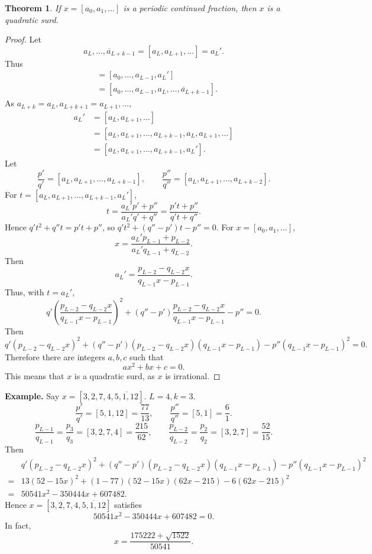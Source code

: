 \documentclass{article}
\newtheorem{theorem}{Theorem}
\theoremstyle{definition}
\begin{document}
\begin{theorem}
If $x=[a_0,a_1,\ldots]$ is a periodic continued fraction, then $x$ is a quadratic surd.
\end{theorem}
\begin{proof}
Let
\[
\overline{a_L,\ldots,a_{L+k-1}} = [a_L,a_{L+1},\ldots] = a_L'.
\]
Thus
\begin{align*}
[a_0,\ldots,a_{L-1},a_L,a_{L+1},\ldots]
&=[a_0,\ldots,a_{L-1},a_L']\\
&=[a_0,\ldots,a_{L-1},\overline{a_L,\ldots,a_{L+k-1}}].
\end{align*}
As $a_{L+k}=a_L,a_{L+k+1}=a_{L+1},\ldots$, 
\begin{align*}
a_L'& = [a_L,a_{L+1},\ldots]\\
&=  [a_L,a_{L+1},\ldots,a_{L+k-1},a_L,a_{L+1},\ldots]\\
&=[a_L,a_{L+1},\ldots,a_{L+k-1},a_L'].
\end{align*}
Let
\[
\frac{p'}{q'} = [a_L,a_{L+1},\ldots,a_{L+k-1}],
\qquad 
\frac{p''}{q''} = [a_L,a_{L+1},\ldots,a_{L+k-2}].
\]
For $t=[a_L,a_{L+1},\ldots,a_{L+k-1},a_L']$, 
\[
t = \frac{a_L'p'+p''}{a_L'q'+q''} = \frac{p't+p''}{q't+q''}.
\]
Hence $q't^2+q''t=p't+p''$, so $q't^2 + (q''-p')t - p''=0$.
For $x=[a_0,a_1,\ldots]$,
\[
x = \frac{a_L'p_{L-1}+p_{L-2}}{a_L'q_{L-1}+q_{L-2}}.
\]
Then
\[
a_L' = \frac{p_{L-2}-q_{L-2}x}{q_{L-1}x-p_{L-1}}.
\]
Thus, with $t=a_L'$,
\[
q' \left(\frac{p_{L-2}-q_{L-2}x}{q_{L-1}x-p_{L-1}}\right)^2 + (q''-p') \frac{p_{L-2}-q_{L-2}x}{q_{L-1}x-p_{L-1}}
-p''=0.
\]
Then
\[
q'(p_{L-2}-q_{L-2}x)^2 + (q''-p') (p_{L-2}-q_{L-2}x)(q_{L-1}x-p_{L-1})
-p''(q_{L-1}x-p_{L-1})^2=0.
\]
Therefore there are integers $a,b,c$ such that
\[
ax^2+bx+c=0.
\]
This means that $x$ is a quadratic surd, as $x$ is irrational.
\end{proof}


\textbf{Example.} Say $x=[3,2,7,4,\overline{5,1,12}]$.
$L=4, k=3$. 
\[
\frac{p'}{q'} = [5,1,12] = \frac{77}{13},
\qquad \frac{p''}{q''} = [5,1] = \frac{6}{1}.
\]
\[
\frac{p_{L-1}}{q_{L-1}}=\frac{p_3}{q_3} =[3,2,7,4] =\frac{215}{62},
\qquad 
\frac{p_{L-2}}{q_{L-2}} = \frac{p_2}{q_2} = [3,2,7] = \frac{52}{15}.
\]
Then
\begin{align*}
&q'(p_{L-2}-q_{L-2}x)^2 + (q''-p') (p_{L-2}-q_{L-2}x)(q_{L-1}x-p_{L-1})
-p''(q_{L-1}x-p_{L-1})^2\\
=&13(52 - 15x)^2+(1-77)(52-15x)(62x-215)-6(62x-215)^2\\
=&50541x^2-350444x+607482.
\end{align*}
Hence $x=[3,2,7,4,\overline{5,1,12}]$ satisfies
\[
50541x^2-350444x+607482=0.
\]
In fact, 
\[
x=\frac{175222+\sqrt{1522}}{50541}.
\]
\end{document}
